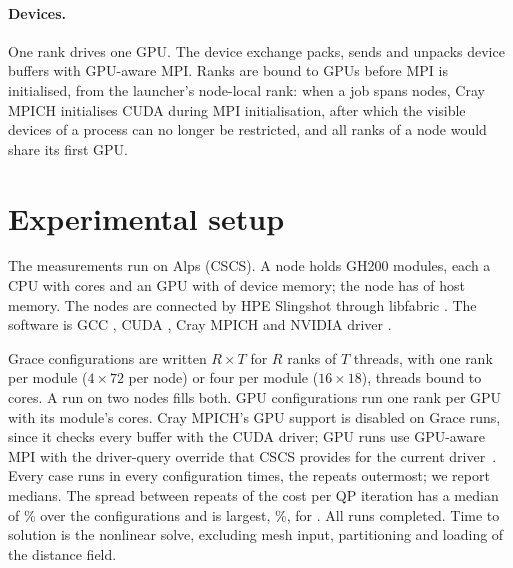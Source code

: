 \documentclass[sigconf,nonacm]{acmart}
\begin{document}
\paragraph{Devices.} One rank drives one GPU. The device exchange packs, sends and unpacks device
buffers with GPU-aware MPI. Ranks are bound to GPUs before MPI is initialised, from the launcher's
node-local rank: when a job spans nodes, Cray MPICH initialises CUDA during MPI initialisation,
after which the visible devices of a process can no longer be restricted, and all ranks of a node
would share its first GPU.

\section{Experimental setup}

The measurements run on Alps (CSCS). A node holds \machineModules{} GH200 modules, each a
\machineCPU{} CPU with \machineCores{} cores and an \machineGPU{} GPU with \machineGPUMemory{} of
device memory; the node has \machineHostMemory{} of host memory. The nodes are connected by HPE
Slingshot through libfabric \machineLibfabric{}. The software is GCC \machineGCC{}, CUDA
\machineCUDA{}, Cray MPICH \machineMPICH{} and NVIDIA driver \machineDriver{}.

Grace configurations are written $R\times T$ for $R$ ranks of $T$ threads, with one rank per
module ($4\times72$ per node) or four per module ($16\times18$), threads bound to cores. A run on
two nodes fills both. GPU
configurations run one rank per GPU with its module's \machineCores{} cores. Cray MPICH's GPU
support is disabled on Grace runs, since it checks every buffer with the CUDA driver; GPU runs
use GPU-aware MPI with the driver-query override that CSCS provides for the current
driver~\cite{cscsmpich}. Every case runs in every configuration \benchRepeats{} times, the
repeats outermost; we report medians. The spread between repeats of the cost per QP iteration
has a median of \benchSpreadMedian\% over the configurations and is largest, \benchSpread\%, for
\benchSpreadWhere{}. All \benchRuns{} runs completed. Time to solution is the nonlinear
solve, excluding mesh input, partitioning and loading of the distance field.

\begin{table}
\caption{Cases. Degrees of freedom of the valve blocks; contact nodes are the skin nodes within
the cutoff of the obstacle at the start.}
\label{tab:cases}
\small

\end{table}
\end{document}
